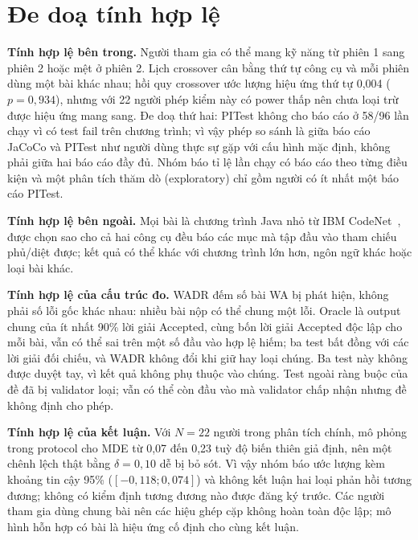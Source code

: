 \section{Đe doạ tính hợp lệ}
\label{sec:threats}

\textbf{Tính hợp lệ bên trong.}
Người tham gia có thể mang kỹ năng từ phiên 1 sang phiên 2 hoặc mệt ở phiên 2.
Lịch crossover cân bằng thứ tự công cụ và mỗi phiên dùng một bài khác nhau; hồi quy crossover ước lượng hiệu ứng thứ tự 0,004 ($p = 0,934$), nhưng với 22 người phép kiểm này có power thấp nên chưa loại trừ được hiệu ứng mang sang.
Đe doạ thứ hai: PITest không cho báo cáo ở 58/96 lần chạy vì có test fail trên chương trình; vì vậy phép so sánh là giữa báo cáo JaCoCo và PITest như người dùng thực sự gặp với cấu hình mặc định, không phải giữa hai báo cáo đầy đủ.
Nhóm báo tỉ lệ lần chạy có báo cáo theo từng điều kiện và một phân tích thăm dò (exploratory) chỉ gồm người có ít nhất một báo cáo PITest.

\textbf{Tính hợp lệ bên ngoài.}
Mọi bài là chương trình Java nhỏ từ IBM CodeNet~\cite{puri2021}, được chọn sao cho cả hai công cụ đều báo các mục mà tập đầu vào tham chiếu phủ/diệt được; kết quả có thể khác với chương trình lớn hơn, ngôn ngữ khác hoặc loại bài khác.

\textbf{Tính hợp lệ của cấu trúc đo.}
WADR đếm số bài WA bị phát hiện, không phải số lỗi gốc khác nhau: nhiều bài nộp có thể chung một lỗi.
Oracle là output chung của ít nhất 90\% lời giải Accepted, cùng bốn lời giải Accepted độc lập cho mỗi bài, vẫn có thể sai trên một số đầu vào hợp lệ hiếm; ba test bất đồng với các lời giải đối chiếu, và WADR không đổi khi giữ hay loại chúng.
Ba test này không được duyệt tay, vì kết quả không phụ thuộc vào chúng.
Test ngoài ràng buộc của đề đã bị validator loại; vẫn có thể còn đầu vào mà validator chấp nhận nhưng đề không định cho phép.

\textbf{Tính hợp lệ của kết luận.}
Với $N = 22$ người trong phân tích chính, mô phỏng trong protocol cho MDE từ 0,07 đến 0,23 tuỳ độ biến thiên giả định, nên một chênh lệch thật bằng $\delta = 0,10$ dễ bị bỏ sót.
Vì vậy nhóm báo ước lượng kèm khoảng tin cậy 95\% ($[-0,118; 0,074]$) và không kết luận hai loại phản hồi tương đương; không có kiểm định tương đương nào được đăng ký trước.
Các người tham gia dùng chung bài nên các hiệu ghép cặp không hoàn toàn độc lập; mô hình hỗn hợp có bài là hiệu ứng cố định cho cùng kết luận.